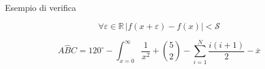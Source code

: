 \documentclass[italian, a4paper]{article}
\begin{document}
\Titolo

Esempio di verifica

\[\forall \varepsilon\in\mathbb{R}\,\left\lvert f(x+\varepsilon)-f(x)\right\rvert<\mathscr{S}\]

\[A\widehat{B}C=120^\circ-\int_{x=0}^\infty\frac{1}{x^2}+{5\choose2}-\sum_{i=1}^{N}\frac{i(i+1)}{2}-\overline{x}\]
\end{document}
